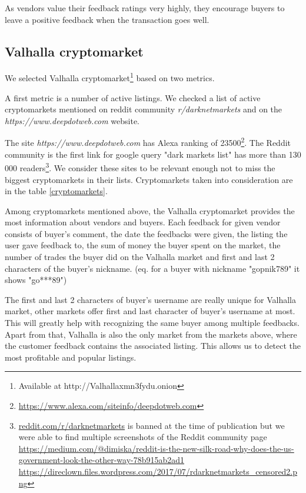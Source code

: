 \documentclass[
  digital, %
  table,   %
  lof,     %
  lot,     %
  oneside
]{fithesis3}
\begin{document}
As vendors value their feedback ratings very highly, they encourage buyers to leave a positive feedback when the transaction goes well.
 
\subsection{Valhalla cryptomarket}

We selected Valhalla cryptomarket\footnote{Available at http://Valhallaxmn3fydu.onion} based on two metrics.

A first metric is a number of active listings.
We checked a list of active cryptomarkets mentioned on reddit community \emph{r/darknetmarkets} and on the 
\emph{https://www.deepdotweb.com} website.

The site \emph{https://www.deepdotweb.com} has Alexa ranking of 23500\footnote{\url{https://www.alexa.com/siteinfo/deepdotweb.com}}.
The Reddit community is the first link for google query "dark markets list"
has more than 130 000 readers\footnote{\url{reddit.com/r/darknetmarkets} is banned at the time of publication
but we were able to find multiple screenshots of the Reddit community page\newline
\url{https://medium.com/@dimiska/reddit-is-the-new-silk-road-why-does-the-us-government-look-the-other-way-78b915ab2ad1}
\url{https://direclown.files.wordpress.com/2017/07/rdarknetmarkets_censored2.png}}. We consider these sites to be relevant enough not to miss
the biggest cryptomarkets in their lists. Cryptomarkets taken into consideration are in the table \ref{cryptomarkets}.

Among cryptomarkets mentioned above,
the Valhalla cryptomarket provides the most information about vendors and buyers.
Each feedback for given vendor consists of buyer's comment, the date the feedbacks were given, the listing the user gave feedback to, the sum of money the buyer spent on the market, the number of trades the buyer did on the Valhalla market and
first and last 2 characters of the buyer's nickname. 
(eq. for a buyer with nickname "gopnik789" it shows "go***89")

The first and last 2 characters of buyer's username are really unique for Valhalla market,
other markets offer first and last character of buyer's username at most.
This will greatly help with recognizing the same buyer among multiple feedbacks.
Apart from that, Valhalla is also the only market from the markets above, where the customer feedback contains the
associated listing.
This allows us to detect the most profitable and popular listings.
\end{document}
